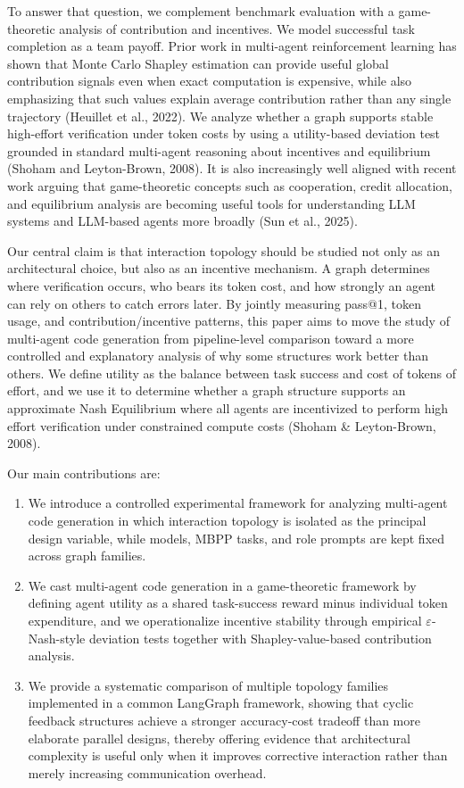 \documentclass[manuscript,screen,review]{acmart}
\begin{document}
To answer that question, we complement benchmark evaluation with a game-theoretic analysis of contribution and incentives. We model successful task completion as a team payoff. Prior work in multi-agent reinforcement learning has shown that Monte Carlo Shapley estimation can provide useful global contribution signals even when exact computation is expensive, while also emphasizing that such values explain average contribution rather than any single trajectory (Heuillet et al., 2022). We analyze whether a graph supports stable high-effort verification under token costs by using a utility-based deviation test grounded in standard multi-agent reasoning about incentives and equilibrium (Shoham and Leyton-Brown, 2008). It is also increasingly well aligned with recent work arguing that game-theoretic concepts such as cooperation, credit allocation, and equilibrium analysis are becoming useful tools for understanding LLM systems and LLM-based agents more broadly (Sun et al., 2025).

Our central claim is that interaction topology should be studied not only as an architectural choice, but also as an incentive mechanism. A graph determines where verification occurs, who bears its token cost, and how strongly an agent can rely on others to catch errors later. By jointly measuring pass@1, token usage, and contribution/incentive patterns, this paper aims to move the study of multi-agent code generation from pipeline-level comparison toward a more controlled and explanatory analysis of why some structures work better than others. We define utility as the balance between task success and cost of tokens of effort, and we use it to determine whether a graph structure supports an approximate Nash Equilibrium where all agents are incentivized to perform high effort verification under constrained compute costs (Shoham \& Leyton-Brown, 2008).

Our main contributions are:
\vspace{-0.5em}
\begin{enumerate}
    \item We introduce a controlled experimental framework for analyzing multi-agent code generation in which interaction topology is isolated as the principal design variable, while models, MBPP tasks, and role prompts are kept fixed across graph families.
    \item We cast multi-agent code generation in a game-theoretic framework by defining agent utility as a shared task-success reward minus individual token expenditure, and we operationalize incentive stability through empirical $\varepsilon$-Nash-style deviation tests together with Shapley-value-based contribution analysis.
    \item We provide a systematic comparison of multiple topology families implemented in a common LangGraph framework, showing that cyclic feedback structures achieve a stronger accuracy-cost tradeoff than more elaborate parallel designs, thereby offering evidence that architectural complexity is useful only when it improves corrective interaction rather than merely increasing communication overhead.
\end{enumerate}
\end{document}
